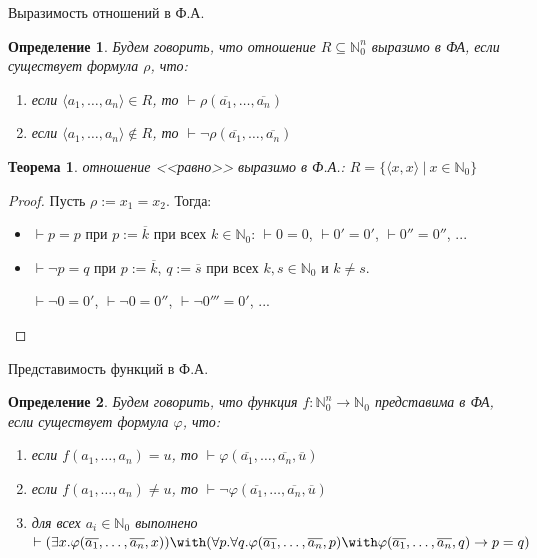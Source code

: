 \documentclass[aspectratio=169]{beamer}
\newtheorem{thm}{Теорема}[section]
\newtheorem{dfn}{Определение}[section]
\begin{document}
\begin{frame}{Выразимость отношений в Ф.А.}
\begin{dfn}
Будем говорить, что отношение $R\subseteq \mathbb{N}^n_0$ выразимо в ФА, 
если существует формула $\rho$, что:
\begin{enumerate}
\item если $\langle a_1,\dots,a_n \rangle \in R$, то $\vdash \rho(\overline{a_1},\dots,\overline{a_n})$
\item если $\langle a_1,\dots,a_n \rangle \notin R$, то $\vdash \neg\rho(\overline{a_1},\dots,\overline{a_n})$
\end{enumerate}
\end{dfn}\pause

\begin{thm} отношение <<равно>> выразимо в Ф.А.:
$R = \{ \langle x,x \rangle\ |\ x \in \mathbb{N}_0 \}$
\end{thm}\pause

\begin{proof}
Пусть $\rho := x_1=x_2$. \pause Тогда:
\begin{itemize}
\item $\vdash p = p$ при $p := \overline{k}$ при всех $k \in \mathbb{N}_0$: \pause $\vdash 0=0$, $\vdash 0'=0'$, $\vdash 0''=0''$, ... \pause
\item $\vdash \neg p = q$ при $p := \overline{k}$, $q := \overline{s}$ при всех $k,s \in \mathbb{N}_0$ и $k \ne s$.

\pause $\vdash \neg 0 = 0'$, $\vdash \neg 0 = 0''$, $\vdash \neg 0''' = 0'$, ...
\end{itemize}
\end{proof}

\end{frame}

\begin{frame}{Представимость функций в Ф.А.}
\begin{dfn}
Будем говорить, что функция $f: \mathbb{N}^n_0\to\mathbb{N}_0$ представима в ФА, 
если существует формула $\varphi$, что:
\begin{enumerate}
\item если $f(a_1,\dots,a_n) = u$, то $\vdash \varphi(\overline{a_1},\dots,\overline{a_n},\overline{u})$
\item если $f(a_1,\dots,a_n) \ne u$, то $\vdash \neg\varphi(\overline{a_1},\dots,\overline{a_n},\overline{u})$
\item для всех $a_i \in \mathbb{N}_0$ выполнено $\vdash (\exists x.\varphi(\overline{a_1},\dots,\overline{a_n},x)) \with 
   (\forall p.\forall q.\varphi(\overline{a_1},\dots,\overline{a_n},p)\with \varphi(\overline{a_1},\dots,\overline{a_n},q)\rightarrow p=q)$
\end{enumerate}
\end{dfn}
\end{frame}
\end{document}
